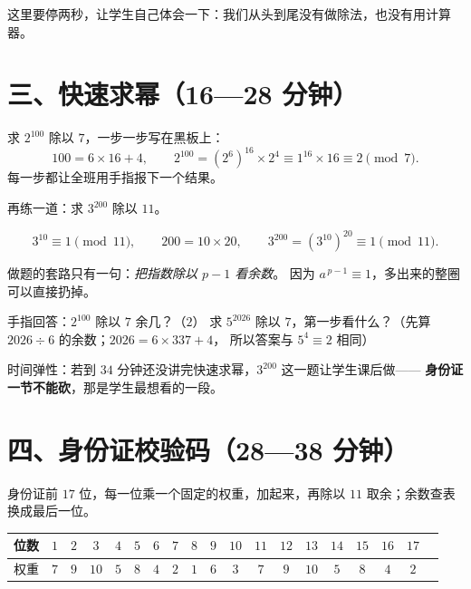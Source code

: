 \begin{zhu}
  这里要停两秒，让学生自己体会一下：我们从头到尾没有做除法，也没有用计算器。
\end{zhu}

\section*{三、快速求幂（16—28 分钟）}

\begin{caozuo}
  求 \(2^{100}\) 除以 \(7\)，一步一步写在黑板上：
  \[
    100=6\times16+4,\qquad
    2^{100}=(2^{6})^{16}\times2^{4}\equiv1^{16}\times16\equiv2\pmod 7 .
  \]
  每一步都让全班用手指报下一个结果。
\end{caozuo}

再练一道：求 \(3^{200}\) 除以 \(11\)。

\[
  3^{10}\equiv1\pmod{11},\qquad
  200=10\times20,\qquad 3^{200}=(3^{10})^{20}\equiv1\pmod{11}.
\]

\begin{zhu}
  做题的套路只有一句：\emph{把指数除以 \(p-1\) 看余数}。
  因为 \(a^{\,p-1}\equiv1\)，多出来的整圈可以直接扔掉。
\end{zhu}

\begin{caozuo}
  手指回答：\(2^{100}\) 除以 \(7\) 余几？（\(2\)）
  求 \(5^{2026}\) 除以 \(7\)，第一步看什么？（先算 \(2026\div6\) 的余数；\(2026=6\times337+4\)，
  所以答案与 \(5^{4}\equiv2\) 相同）
\end{caozuo}

\begin{zhu}
  时间弹性：若到 \(34\) 分钟还没讲完快速求幂，\(3^{200}\) 这一题让学生课后做——
  \textbf{身份证一节不能砍}，那是学生最想看的一段。
\end{zhu}

\section*{四、身份证校验码（28—38 分钟）}

身份证前 \(17\) 位，每一位乘一个固定的权重，加起来，再除以 \(11\) 取余；余数查表换成最后一位。

\begin{center}
\begin{tabular}{@{}lc*{17}{c}@{}}
  \toprule
  位数 & \(1\) & \(2\) & \(3\) & \(4\) & \(5\) & \(6\) & \(7\) & \(8\) & \(9\) & \(10\) & \(11\) & \(12\) & \(13\) & \(14\) & \(15\) & \(16\) & \(17\) \\
  \midrule
  权重 & \(7\) & \(9\) & \(10\) & \(5\) & \(8\) & \(4\) & \(2\) & \(1\) & \(6\) & \(3\) & \(7\) & \(9\) & \(10\) & \(5\) & \(8\) & \(4\) & \(2\) \\
  \bottomrule
\end{tabular}
\end{center}


